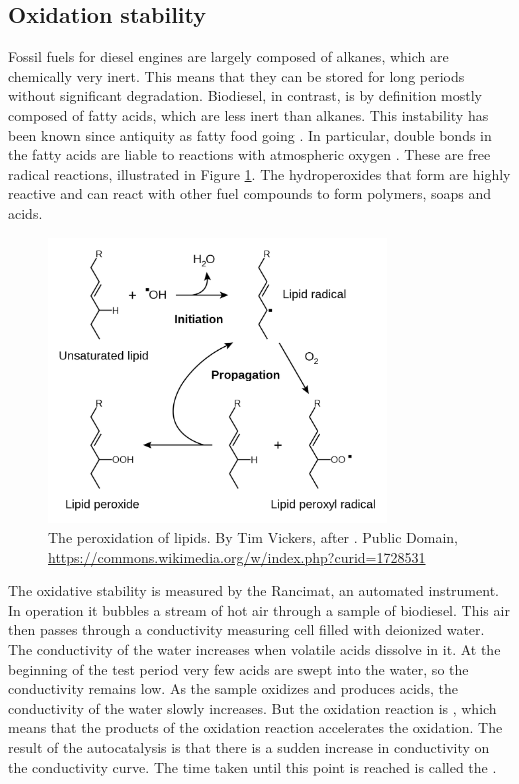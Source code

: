 \subsection{Oxidation stability}
\label{sec:Rancimat}

Fossil fuels for diesel engines are largely composed of alkanes, which are
chemically very inert. This means that they can be stored for long periods
without significant degradation. Biodiesel, in contrast, is by definition
\autocite[Paragraph 4.1.1]{SANS1935} mostly composed of fatty acids, which are
less inert than alkanes. This instability has been known since antiquity as
fatty food going . In particular, double bonds in the fatty
acids are liable to reactions with atmospheric oxygen \autocite{Velasco2010}.
These are free radical reactions, illustrated in Figure \ref{fig:RancidRadical}.
The hydroperoxides that form are highly reactive and can react with other fuel
compounds to form polymers, soaps and acids.

\begin{figure}
\centering
\includegraphics[width=0.8\textwidth]{Figures/1281px-Lipid_peroxidation.png}
\decoRule

\caption[The peroxidation of lipids.]{The peroxidation of lipids. By Tim
Vickers, after \autocite{Young2001}. Public Domain,
\url{https://commons.wikimedia.org/w/index.php?curid=1728531}}

\label{fig:RancidRadical}
\end{figure}

The oxidative stability is measured by the Rancimat, an automated instrument. In
operation it bubbles a stream of hot air through a sample of biodiesel. This air
then passes through a conductivity measuring cell filled with deionized water.
The conductivity of the water increases when volatile acids dissolve in it. At
the beginning of the test period very few acids are swept into the water, so the
conductivity remains low. As the sample oxidizes and produces acids, the
conductivity of the water slowly increases. But the oxidation reaction is
, which means that the products of the oxidation reaction
accelerates the oxidation. The result of the autocatalysis is that there is a
sudden increase in conductivity on the conductivity curve. The time taken until
this point is reached is called the .


